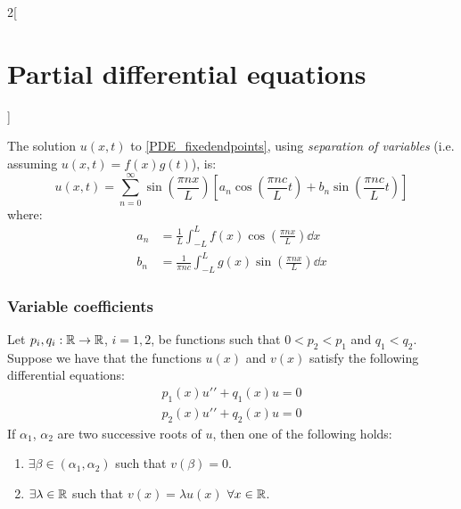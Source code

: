 \documentclass[../../../main_math.tex]{subfiles}
\begin{document}
\begin{multicols}{2}[\section{Partial differential equations}]
\begin{center}
\begin{minipage}{\linewidth}
      \label{PDE_waves-char-solve}
    \end{minipage}
  \end{center}
  \begin{method}
    The solution $u(x,t)$ to \cref{PDE_fixedendpoints}, using \emph{separation of variables} (i.e. assuming $u(x,t)=f(x)g(t)$), is: $$u(x,t)=\sum_{n=0}^\infty \sin\left(\frac{\pi n x}{L}\right)\left[a_n\cos\left(\frac{\pi n c}{L}t\right)+ b_n\sin\left( \frac{\pi n c}{L}t\right)\right]$$ where:
    \begin{align*}
      a_n & =\frac{1}{L}\int_{-L}^Lf(x)\cos\left(\frac{\pi n x}{L}\right)\dd{x}       \\
      b_n & =\frac{1}{\pi n c}\int_{-L}^Lg(x)\sin\left(\frac{\pi n x}{L}\right)\dd{x}
    \end{align*}
  \end{method}
  \subsubsection{Variable coefficients}
  \begin{theorem}
    Let $p_i,q_i:\mathbb{R}\rightarrow\mathbb{R}$, $i=1,2$, be functions such that $0<p_2<p_1$ and $q_1<q_2$. Suppose we have that the functions $u(x)$ and $v(x)$ satisfy the following differential equations:
    \begin{align*}
      {p_1(x)u'}'+q_1(x)u=0 \\
      {p_2(x)u'}'+q_2(x)u=0
    \end{align*}
    If $\alpha_1$, $\alpha_2$ are two successive roots of $u$, then one of the following holds:
    \begin{enumerate}
      \item $\exists \beta\in(\alpha_1,\alpha_2)$ such that $v(\beta)=0$.
      \item $\exists\lambda\in\mathbb{R}$ such that $v(x)=\lambda u(x)$ $\forall x\in\mathbb{R}$.
    \end{enumerate}
  \end{theorem}
\end{multicols}
\end{document}
